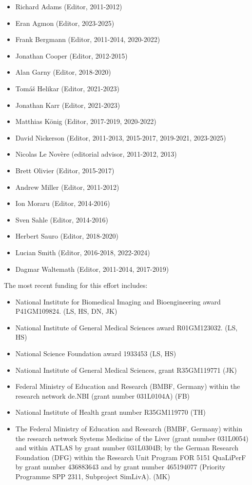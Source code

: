 \documentclass[pdftex,rgb,dvipsnames,svgnames,hyperref,table]{report}
\begin{document}
\begin{itemize}
\item Richard Adams (Editor, 2011-2012)
\item Eran Agmon (Editor, 2023-2025)
\item Frank Bergmann (Editor, 2011-2014, 2020-2022)
\item Jonathan Cooper (Editor, 2012-2015)
\item Alan Garny (Editor, 2018-2020)
\item Tom\'{a}\v{s} Helikar (Editor, 2021-2023)
\item Jonathan Karr (Editor, 2021-2023)
\item Matthias K\"{o}nig (Editor, 2017-2019, 2020-2022)
\item David Nickerson (Editor, 2011-2013, 2015-2017, 2019-2021, 2023-2025)
\item Nicolas Le Nov{\`e}re (editorial advisor, 2011-2012, 2013)
\item Brett Olivier (Editor, 2015-2017)
\item Andrew Miller (Editor, 2011-2012)
\item Ion Moraru (Editor, 2014-2016)
\item Sven Sahle (Editor, 2014-2016)
\item Herbert Sauro (Editor, 2018-2020)
\item Lucian Smith (Editor, 2016-2018, 2022-2024)
\item Dagmar Waltemath (Editor, 2011-2014, 2017-2019)
\end{itemize}

The most recent funding for this effort includes:
\begin{itemize}
\item{National Institute for Biomedical Imaging and Bioengineering award P41GM109824. (LS, HS, DN, JK)}
\item{National Institute of General Medical Sciences award R01GM123032. (LS, HS)}
\item{National Science Foundation award 1933453 (LS, HS)}
\item{National Institute of General Medical Sciences, grant R35GM119771 (JK)}
\item{Federal Ministry of Education and Research (BMBF, Germany) within the research network de.NBI (grant number 031L0104A) (FB)}
\item{National Institute of Health grant number R35GM119770 (TH)}
\item{The Federal Ministry of Education and Research (BMBF, Germany) within the research network Systems Medicine of the Liver (grant number 031L0054) and within ATLAS by grant number 031L0304B; by the German Research Foundation (DFG) within the Research Unit Program FOR 5151 QuaLiPerF by grant number 436883643 and by grant number 465194077 (Priority Programme SPP 2311, Subproject SimLivA). (MK)}
\end{itemize}
\end{document}
